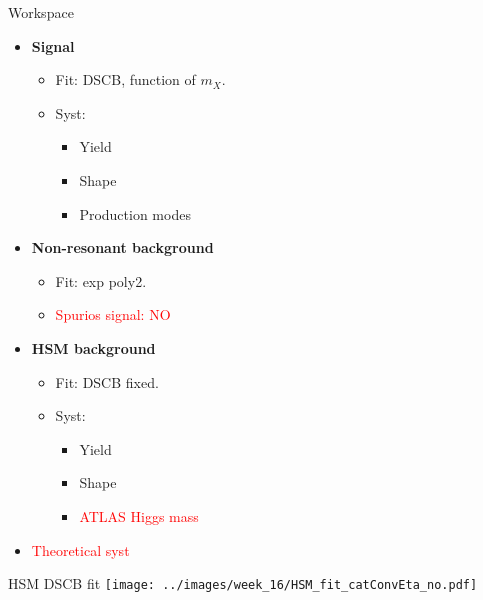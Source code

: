 \documentclass[10pt,UKenglish, leqno, xcolor = dvipsnames]{beamer}
\begin{document}
		\begin{frame}{Workspace}
			\vfill
			\begin{itemize}
				\item \textbf{Signal}
				\begin{itemize}
					\item Fit: DSCB, function of $m_X$.
					\item Syst:
					\begin{itemize}
						\item Yield
						\item Shape
						\item Production modes
					\end{itemize}
				\end{itemize}
				\item \textbf{Non-resonant background}
				\begin{itemize}
					\item Fit: exp poly2.
					\item \textcolor{red}{Spurios signal: NO}
				\end{itemize}
				
				\item \textbf{HSM background}
				\begin{itemize}
					\item Fit: DSCB fixed.
					\item Syst:
					\begin{itemize}
						\item Yield
						\item Shape
						\item \textcolor{red}{ATLAS Higgs mass}
					\end{itemize}
				\end{itemize}
				\item \textcolor{red}{Theoretical syst}
			\end{itemize}
			\vfill
		\end{frame}
	
		\begin{frame}{HSM DSCB fit}
			\vfill
			\centering
			\texttt{[image: ../images/week\_16/HSM\_fit\_catConvEta\_no.pdf]}
			\vfill
		\end{frame}
	
\end{document}
